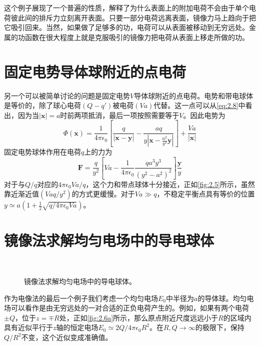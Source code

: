 \documentclass[12pt]{book}
\numberwithin{equation}{chapter}
\numberwithin{figure}{chapter}
\numberwithin{footnote}{page}
\begin{document}
这个例子展现了一个普遍的性质，解释了为什么表面上的附加电荷不会由于单个电荷彼此间的排斥力立刻离开表面。只要一部分电荷远离表面，镜像力马上趋向于把它吸引回来。当然，如果做了足够多的功，电荷可以从表面被移动到无穷远处。金属的功函数在很大程度上就是克服吸引的镜像力把电荷从表面上移走所做的功。

\section{固定电势导体球附近的点电荷}\label{sec:2.4}

另一个可以被简单讨论的问题是固定电势$V$导体球附近的点电荷。电势和带电球体是等价的，除了球心电荷$(Q-q')$被电荷$(Va)$代替。这一点可以从\autoref{eq:2.8}中看出，因为当$|\mathbf{x}|=a$时前两项抵消，最后一项按照需要等于$V$。因此电势为
\begin{equation}\label{eq:2.10}
    \Phi(\mathbf{x})=\frac{1}{4\pi\epsilon_0}[\frac{q}{|\mathbf{x}-\mathbf{y}|}-\frac{aq}{y|\mathbf{x}-\frac{a^2}{y^2}\mathbf{y}|}]+\frac{Va}{|\mathbf{x}|}
\end{equation}
固定电势球体作用在电荷$q$上的力为
\begin{equation}\label{eq:2.11}
    \mathbf{F}=\frac{q}{y^2}[Va-\frac{1}{4\pi\epsilon_0}\frac{qa^3y^3}{(y^2-a^2)^2}]\frac{\mathbf{y}}{y}
\end{equation}
对于与$Q/q$对应的$4\pi\epsilon_0Va/q$，这个力和带点球体十分接近，正如\autoref{fig:2.5}所示，虽然靠近渐近值$(Vaq/y^2)$的方式更缓慢。对于$Va\gg q$，不稳定平衡点具有等价的位置$y\simeq a(1+\frac{1}{2}\sqrt{q/4\pi\epsilon_0Va})$。

\section{镜像法求解均匀电场中的导电球体}\label{sec:2.5}

\begin{figure}[!ht]
  \centering
  \\
    \captionsetup{justification=raggedright, singlelinecheck=false}
  \caption{镜像法求解均匀电场中的导电球体。}
  \label{fig:2.6}
\end{figure}

作为电像法的最后一个例子我们考虑一个均匀电场$E_0$中半径为$a$的导体球。均匀电场可以看作是由无穷远处的一对合适的正负电荷产生的。例如，如果有两个电荷$\pm Q$，位于$z=\mp R$处，正如\autoref{fig:2.6a}所示，那么原点附近尺度远远小于$R$的区域内具有近似平行于$z$轴的恒定电场$E_0\simeq 2Q/4\pi\epsilon_0R^2$。在$R,Q\to\infty$的极限下，保持$Q/R^2$不变，这个近似变成准确值。
\end{document}
